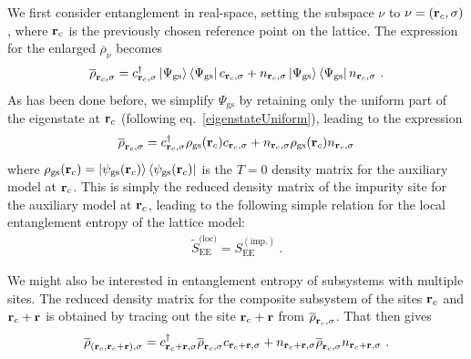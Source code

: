 \documentclass[reprint,hidelinks]{revtex4-2}
\begin{document}
We first consider entanglement in real-space, setting the subspace \(\nu\) to \(\nu=({\bf r}_c,\sigma)\), where \({\bf r}_c\) is the previously chosen reference point on the lattice. The expression for the enlarged \(\overline\rho_{\nu}\) becomes
\begin{equation}\begin{aligned}
	\overline\rho_{{\bf r}_c,\sigma} = c^\dagger_{{\bf r}_c,\sigma} \ket{\Psi_\text{gs}}\bra{\Psi_\text{gs}} c_{{\bf r}_c,\sigma} + n_{{\bf r}_c,\sigma} \ket{\Psi_\text{gs}}\bra{\Psi_\text{gs}} n_{{\bf r}_c,\sigma}~.
\end{aligned}\end{equation}
As has been done before, we simplify \(\Psi_\text{gs}\) by retaining only the uniform part of the eigenstate at \({\bf r}_c\) (following eq.~\ref{eigenstateUniform}), leading to the expression
\begin{equation}\begin{aligned}
	\overline\rho_{{\bf r}_c,\sigma} = c^\dagger_{{\bf r}_c,\sigma} \rho_\text{gs}({\bf r}_c) c_{{\bf r}_c,\sigma} + n_{{\bf r}_c,\sigma} \rho_\text{gs}({\bf r}_c) n_{{\bf r}_c,\sigma}
\end{aligned}\end{equation}
where \(\rho_\text{gs}({\bf r}_c) = \ket{\psi_\text{gs}({\bf r}_c)}\bra{\psi_\text{gs}({\bf r}_c)}\) is the \(T=0\) density matrix for the auxiliary model at \({\bf r}_c\). This is simply the reduced density matrix of the impurity site for the auxiliary model at \({\bf r}_c\), leading to the following simple relation for the local entanglement entropy of the lattice model:
\begin{equation}\begin{aligned}
	\tilde S_\text{EE}^{\text{(loc)}} = S_\text{EE}^{(\text{imp.})}~.
\end{aligned}\end{equation}

We might also be interested in entanglement entropy of subsystems with multiple sites. The reduced density matrix for the composite subsystem of the sites \({\bf r}_c\) and \({\bf r}_c + {\bf r}\) is obtained by tracing out the site \({\bf r}_c + {\bf r}\) from \(\overline\rho_{{\bf r}_c,\sigma}\). That then gives
\begin{equation}\begin{aligned}
	\overline\rho_{({\bf r}_c, {\bf r}_c + {\bf r}),\sigma} = c^\dagger_{{\bf r}_c + {\bf r},\sigma} \overline\rho_{{\bf r}_c,\sigma} c_{{\bf r}_c + {\bf r},\sigma} + n_{{\bf r}_c + {\bf r},\sigma} \overline\rho_{{\bf r}_c,\sigma} n_{{\bf r}_c + {\bf r},\sigma}~.
\end{aligned}\end{equation}
\end{document}
